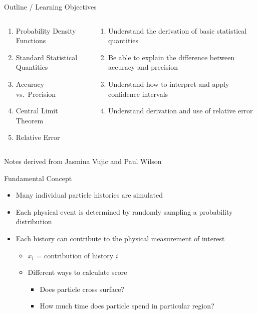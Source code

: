 \documentclass[xcolor=x11names,compress]{beamer}
\renewcommand{\(}{\begin{columns}}
\renewcommand{\)}{\end{columns}}
\newcommand{\<}[1]{\begin{column}{#1}}
\renewcommand{\>}{\end{column}}
\begin{document}
\begin{frame}{Outline / Learning Objectives}

\begin{columns}
  \begin{column}{0.5\textwidth}
    \begin{enumerate}
    \item Probability Density Functions
    \item Standard Statistical Quantities
    \item Accuracy vs.\ Precision
    \item Central Limit Theorem
    \item Relative Error
    \end{enumerate}
  \end{column}
  \begin{column}{0.5\textwidth}
    \begin{enumerate}
    \item Understand the derivation of basic statistical quantities
    \item Be able to explain the difference between accuracy and precision 
    \item Understand how to interpret and apply confidence intervals
    \item Understand derivation and use of relative error
    \end{enumerate}
  \end{column}
\end{columns}

\vspace*{1em}
Notes derived from Jasmina Vujic and Paul Wilson
\end{frame}


\begin{frame}{Fundamental Concept}

\begin{itemize}
  \item Many individual particle histories are simulated
  \item Each physical event is determined by
randomly sampling a \alert{probability distribution}
  \item Each history can contribute to the physical
measurement of interest
    \begin{itemize}
    \item $x_i$ = contribution of history $i$
    \item Different ways to calculate score
      \begin{itemize}
      \item Does particle cross surface?
      \item How much time does particle spend in particular region?
      \end{itemize}
    \end{itemize}
\end{itemize}
\end{frame}
\end{document}
